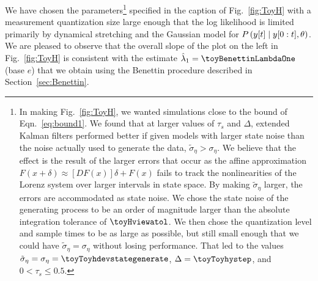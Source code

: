 We have chosen the parameters\footnote{ In making Fig.~\ref{fig:ToyH},
  we wanted simulations close to the bound of Eqn.~\eqref{eq:bound1}.
  We found that at larger values of $\tau_s$ and $\Delta$, extended
  Kalman filters performed better if given models with larger state
  noise than the noise actually used to generate the data, \ie
  $\tilde \sigma_\eta > \sigma_\eta$.  We believe that the effect is
  the result of the larger errors that occur as the affine
  approximation $F(x+\delta) \approx [DF(x)] \delta + F(x)$ fails to
  track the nonlinearities of the Lorenz system over larger intervals
  in state space.  By making $\tilde \sigma_\eta$ larger, the errors
  are accommodated as state noise.  We chose the state noise of the
  generating process to be an order of magnitude larger than the
  absolute integration tolerance of $\toyHviewatol$.  We then chose
  the quantization level and sample times to be as large as possible,
  but still small enough that we could have
  $\tilde \sigma_\eta = \sigma_\eta$ without losing performance.  That
  led to the values
  $\tilde \sigma_\eta = \sigma_\eta = \toyToyhdevstategenerate$,
  $\Delta = \toyToyhystep$, and $0 < \tau_s \leq 0.5$.} specified in
the caption of Fig.~\ref{fig:ToyH} with a measurement quantization
size large enough that the log likelihood is limited primarily by
dynamical stretching and the Gaussian model for
$ P \left({y}{[t]}\mid y[0:t], \theta \right)$.  We are pleased
to observe that the overall slope of the plot on the left in
Fig.~\ref{fig:ToyH} is consistent with the estimate
$\hat \lambda_1 = \toyBenettinLambdaOne$ (base $e$) that we obtain
using the Benettin procedure described in Section~\ref{sec:Benettin}.

